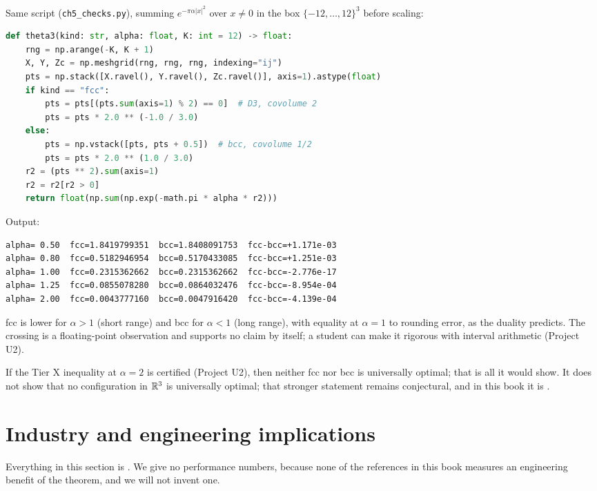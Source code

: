 \begin{numbox}
\tierX{} Same script (\texttt{ch5\_checks.py}), summing $e^{-\pi\alpha|x|^2}$ over $x\ne0$ in the box
$\{-12,\dots,12\}^3$ before scaling:
\begin{lstlisting}[language=Python]
def theta3(kind: str, alpha: float, K: int = 12) -> float:
    rng = np.arange(-K, K + 1)
    X, Y, Zc = np.meshgrid(rng, rng, rng, indexing="ij")
    pts = np.stack([X.ravel(), Y.ravel(), Zc.ravel()], axis=1).astype(float)
    if kind == "fcc":
        pts = pts[(pts.sum(axis=1) % 2) == 0]  # D3, covolume 2
        pts = pts * 2.0 ** (-1.0 / 3.0)
    else:
        pts = np.vstack([pts, pts + 0.5])  # bcc, covolume 1/2
        pts = pts * 2.0 ** (1.0 / 3.0)
    r2 = (pts ** 2).sum(axis=1)
    r2 = r2[r2 > 0]
    return float(np.sum(np.exp(-math.pi * alpha * r2)))
\end{lstlisting}
Output:
\begin{lstlisting}
alpha= 0.50  fcc=1.8419799351  bcc=1.8408091753  fcc-bcc=+1.171e-03
alpha= 0.80  fcc=0.5182946954  bcc=0.5170433085  fcc-bcc=+1.251e-03
alpha= 1.00  fcc=0.2315362662  bcc=0.2315362662  fcc-bcc=-2.776e-17
alpha= 1.25  fcc=0.0855078280  bcc=0.0864032476  fcc-bcc=-8.954e-04
alpha= 2.00  fcc=0.0043777160  bcc=0.0047916420  fcc-bcc=-4.139e-04
\end{lstlisting}
fcc is lower for $\alpha>1$ (short range) and bcc for $\alpha<1$ (long range), with equality at $\alpha=1$ to rounding
error, as the duality predicts. The crossing is a floating-point observation and supports no claim by itself; a
student can make it rigorous with interval arithmetic (Project U2).
\end{numbox}

If the Tier X inequality at $\alpha=2$ is certified (Project U2), then neither fcc nor bcc is universally optimal;
that is all it would show. It does not show that no configuration in
$\mathbb{R}^3$ is universally optimal; that stronger statement remains conjectural, and in this book it is \tierC{}.

\section{Industry and engineering implications}
\label{ch5:sec:industry}

Everything in this section is \tierC{}. We give no performance numbers, because none of the references in this book
measures an engineering benefit of the theorem, and we will not invent one.

